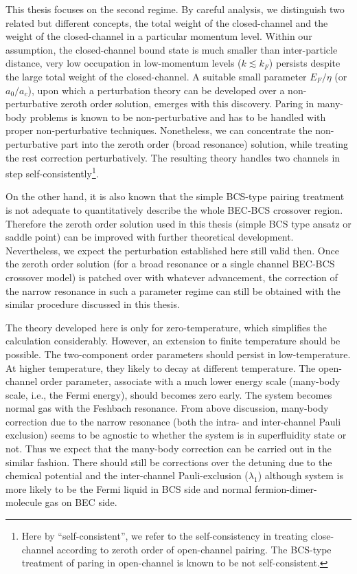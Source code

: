 This thesis focuses on the second regime.  By careful analysis, we distinguish two related but different concepts, the total weight of the closed-channel  and the weight of the closed-channel in a particular momentum level.  
       Within our assumption, the closed-channel bound state is much smaller than inter-particle distance, very low occupation in low-momentum levels ($k\lesssim{}k_{F}$) persists despite the large total weight of the closed-channel.     A suitable small parameter $E_F/\eta$ (or $a_0/a_c$), upon which a perturbation theory can be developed over a non-perturbative zeroth order solution, emerges with this discovery.  Paring in many-body problems is known to be  non-perturbative and has to be handled with proper non-perturbative techniques.  Nonetheless, we can concentrate the non-perturbative part into the zeroth order  (broad resonance) solution, while treating the rest correction perturbatively.   The resulting theory  handles two channels in step self-consistently\footnote{Here by ``self-consistent'', we refer to the self-consistency in treating close-channel according to zeroth order of open-channel pairing.  The BCS-type treatment of paring in open-channel   is known to be not self-consistent. }. 
       
       On the other hand, it is also known that the simple BCS-type pairing treatment is not adequate  to quantitatively describe the whole BEC-BCS crossover region.  Therefore the zeroth order solution used in this thesis (simple BCS type ansatz or saddle point) can be improved with further theoretical development.  Nevertheless, we expect the perturbation established here still valid then.  Once the zeroth order solution (for a broad resonance or a single channel BEC-BCS crossover model) is patched over with whatever advancement, the correction of the narrow resonance in such a parameter regime can still be obtained with the similar procedure discussed in this thesis.  
       
       
\begin{unsure}
The theory developed here is only for zero-temperature, which simplifies the calculation considerably.  However, an extension to finite temperature should be possible.  The two-component order parameters should persist in low-temperature.  At higher temperature, they likely to decay at different temperature.  The open-channel order parameter, associate with a much lower energy scale (many-body scale, i.e., the Fermi energy), should becomes zero early.  The system becomes normal gas with the Feshbach resonance.  From above discussion, many-body correction due to the narrow resonance (both the intra- and inter-channel Pauli exclusion) seems to be agnostic to whether the system is in superfluidity state or not.  Thus we expect that the many-body correction can be carried out in the similar fashion.   There should still be corrections over the detuning due to the chemical potential and the  inter-channel Pauli-exclusion ($\lambda_{1}$) although system is more likely to be the Fermi liquid in BCS side and normal fermion-dimer-molecule gas on BEC side.   
\end{unsure}
